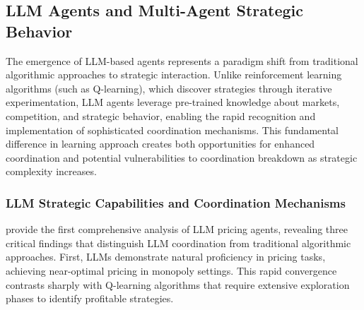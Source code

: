 

\subsection{LLM Agents and Multi-Agent Strategic Behavior}

The emergence of LLM-based agents represents a paradigm shift from traditional algorithmic approaches to strategic interaction. Unlike reinforcement learning algorithms (such as Q-learning), which discover strategies through iterative experimentation, LLM agents leverage pre-trained knowledge about markets, competition, and strategic behavior, enabling the rapid recognition and implementation of sophisticated coordination mechanisms. This fundamental difference in learning approach creates both opportunities for enhanced coordination and potential vulnerabilities to coordination breakdown as strategic complexity increases.

\subsubsection*{LLM Strategic Capabilities and Coordination Mechanisms}

\textcite{fish_algorithmic_2025} provide the first comprehensive analysis of LLM pricing agents, revealing three critical findings that distinguish LLM coordination from traditional algorithmic approaches. First, LLMs demonstrate natural proficiency in pricing tasks, achieving near-optimal pricing in monopoly settings. This rapid convergence contrasts sharply with Q-learning algorithms that require extensive exploration phases to identify profitable strategies.

